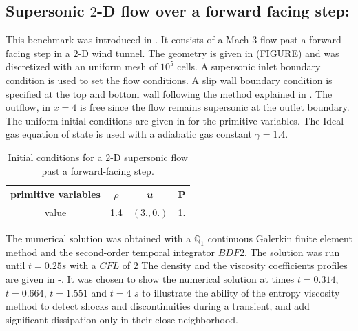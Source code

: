 \subsection{Supersonic $2$-D flow over a forward facing step:} \label{sec:2d-forward-facing-step}
This benchmark was introduced in \cite{FFS}. It consists of a Mach 3 flow past a forward-facing step in a $2$-D wind tunnel. The geometry is given in (FIGURE) and was discretized with an uniform mesh of $10^5$ cells. A supersonic inlet boundary condition is used to set the flow conditions. A slip wall boundary condition is specified at the top and bottom wall following the method explained in . The outflow, in $x=4$ is free since the flow remains supersonic at the outlet boundary. The uniform initial conditions are given in  for the primitive variables. The Ideal gas equation of state is used with a adiabatic gas constant $\gamma = 1.4$.
\begin{table}[H] 
\caption{\label{tb:ic-forward-facing} Initial conditions for a $2$-D supersonic flow past a forward-facing step.}
\begin{center}
\begin{tabular}{|c|c|c|c|}
\hline
 primitive variables   & $\rho$ & $\boldsymbol u$ & P \\ \hline
value & 1.4 & $(3.,0.)$ & 1.\\ \hline
\end{tabular}
\end{center}
\nonumber
\end{table}
The numerical solution was obtained with a $\mathbb Q_1$ continuous Galerkin finite element method and the second-order temporal integrator $BDF2$. The solution was run until $t=0.25s$ with a $CFL$ of $2$ The density and the viscosity coefficients profiles are given in -. It was chosen to show the numerical solution at times $t=0.314$, $t=0.664$, $t=1.551$ and $t=4$ $s$ to illustrate the ability of the entropy viscosity method to detect shocks and discontinuities during a transient, and add significant dissipation only in their close neighborhood. 
